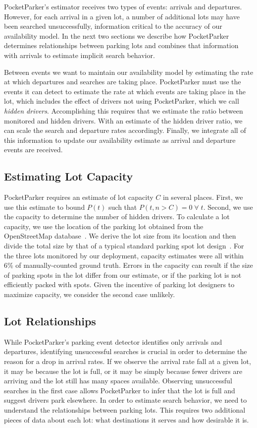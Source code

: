 PocketParker's estimator receives two types of events: arrivals and
departures. However, for each arrival in a given lot, a number of additional
lots may have been searched unsuccessfully, information critical to the
accuracy of our availability model. In the next two sections we describe how
PocketParker determines relationships between parking lots and combines that
information with arrivals to estimate implicit search behavior.

Between events we want to maintain our availability model by estimating the
rate at which departures and searches are taking place. PocketParker must use
the events it can detect to estimate the rate at which events are taking
place in the lot, which includes the effect of drivers not using
PocketParker, which we call \textit{hidden drivers}. Accomplishing this
requires that we estimate the ratio between monitored and hidden drivers.
With an estimate of the hidden driver ratio, we can scale the search and
departure rates accordingly. Finally, we integrate all of this information to
update our availability estimate as arrival and departure events are
received.

\subsection{Estimating Lot Capacity}

PocketParker requires an estimate of lot capacity $C$ in several places.
First, we use this estimate to bound $P(t)$ such that $P(t, n > C) =
0\;\forall\;t$. Second, we use the capacity to determine the number of hidden
drivers. To calculate a lot capacity, we use the location of the parking lot
obtained from the OpenStreetMap database~\cite{openstreetmap}. We derive the
lot size from its location and then divide the total size by that of a
typical standard parking spot lot design~\cite{parkingdesign}. For the three
lots monitored by our deployment, capacity estimates were all within 6\% of
manually-counted ground truth. Errors in the capacity can result if the size
of parking spots in the lot differ from our estimate, or if the parking lot
is not efficiently packed with spots. Given the incentive of parking lot
designers to maximize capacity, we consider the second case unlikely.

\subsection{Lot Relationships}

While PocketParker's parking event detector identifies only arrivals and
departures, identifying unsuccessful searches is crucial in order to
determine the reason for a drop in arrival rates. If we observe the arrival
rate fall at a given lot, it may be because the lot is full, or it may be
simply because fewer drivers are arriving and the lot still has many spaces
available. Observing unsuccessful searches in the first case allows
PocketParker to infer that the lot is full and suggest drivers park
elsewhere. In order to estimate search behavior, we need to understand the
relationships between parking lots. This requires two additional pieces of
data about each lot: what destinations it serves and how desirable it is.

